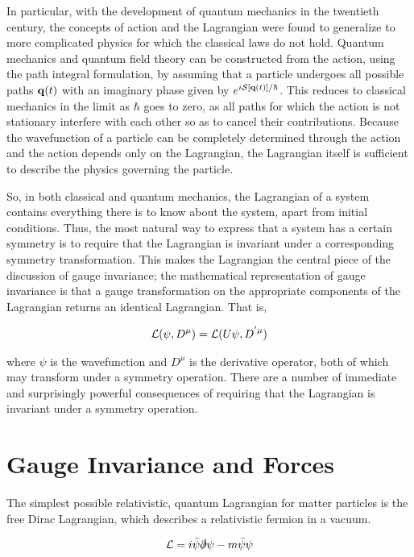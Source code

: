 In particular, with the development of quantum mechanics in the twentieth century, the concepts of action and the Lagrangian were found to generalize to more complicated physics for which the classical laws do not hold. 
Quantum mechanics and quantum field theory can be constructed from the action, using the path integral formulation, by assuming that a particle undergoes all possible paths $\mathbf{q}(t)$ with an imaginary phase given by $e^{i \mathcal{S}[\mathbf{q}(t)]/\hbar}$. 
This reduces to classical mechanics in the limit as $\hbar$ goes to zero, as all paths for which the action is not stationary interfere with each other so as to cancel their contributions. 
Because the  wavefunction of a particle can be completely determined through the action and the action depends only on the Lagrangian, the Lagrangian itself is sufficient to describe the physics governing the particle. 

So, in both classical and quantum mechanics, the Lagrangian of a system contains everything there is to know about the system, apart from initial conditions. 
Thus, the most natural way to express that a system has a certain symmetry is to require that the Lagrangian is invariant under a corresponding symmetry transformation. 
This makes the Lagrangian the central  piece of the discussion of gauge invariance; the mathematical representation of gauge invariance is that a gauge transformation on the appropriate components of the Lagrangian  returns an identical Lagrangian. 
That is,

\begin{align}
\mathcal{L}(\psi,D^{\mu}) = \mathcal{L}(U\psi, D^{'\mu})
\end{align}

\noindent where $\psi$ is the wavefunction and $D^{\mu}$ is the derivative operator, both of which may transform under a symmetry operation.
There are a number of immediate and surprisingly powerful consequences of requiring that the Lagrangian is invariant under a symmetry operation.

\section{Gauge Invariance and Forces}

The simplest possible relativistic, quantum Lagrangian for matter particles is the free Dirac Lagrangian, which describes a relativistic fermion in a vacuum.

\begin{align}\label{eq:free_dirac} 
\mathcal{L} = i\bar{\psi}\slashed{\partial}\psi -m\bar{\psi}\psi 
\end{align}

